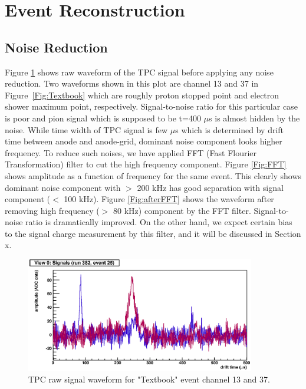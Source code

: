 \section{Event Reconstruction}
\subsection{Noise Reduction}

Figure \ref{Fig:beforeFFT} shows raw waveform of the TPC signal
before applying any noise reduction. Two waveforms shown in this plot
are channel 13 and 37 in Figure~\ref{Fig:Textbook} which are roughly
proton stopped point and electron shower maximum point, respectively.
Signal-to-noise ratio for this particular case is poor and pion signal 
which is supposed to be t=400 $\mu$s is almost hidden by the noise. 
While time width of TPC signal is few $\mu$s which is determined by
drift time between anode and anode-grid, dominant noise component looks
higher frequency. To reduce such noises, we have applied FFT 
(Fast Flourier Transformation) filter to cut the high frequency component.
Figure \ref{Fig:FFT} shows amplitude as a function of frequency
for the same event. This clearly shows dominant noise component with
$>$ 200 kHz has good separation with signal component ($<$ 100 kHz).
Figure \ref{Fig:afterFFT} shows the waveform after removing high frequency
($>$ 80 kHz) component by the FFT filter. Signal-to-noise ratio is dramatically
improved. On the other hand, we expect certain bias to the signal charge
measurement by this filter, and it will be discussed in Section x.

\begin{figure}[htbp]
 \begin{center}
  \includegraphics[width=100mm]{fig/beforeFFT.eps}
 \end{center}
 \caption{TPC raw signal waveform for "Textbook" event channel 13 and 37.}
 \label{Fig:beforeFFT}
\end{figure}

